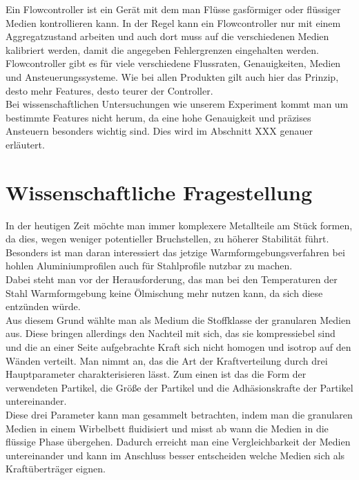 Ein Flowcontroller ist ein Gerät mit dem man Flüsse gasförmiger oder flüssiger Medien kontrollieren kann. In der Regel kann ein Flowcontroller nur mit einem Aggregatzustand arbeiten und auch dort muss auf die verschiedenen Medien kalibriert werden, damit die angegeben Fehlergrenzen eingehalten werden. \\
Flowcontroller gibt es für viele verschiedene Flussraten, Genauigkeiten, Medien und Ansteuerungssysteme. Wie bei allen Produkten gilt auch hier das Prinzip, desto mehr Features, desto teurer der Controller. \\
Bei wissenschaftlichen Untersuchungen wie unserem Experiment kommt man um bestimmte Features nicht herum, da eine hohe Genauigkeit und präzises Ansteuern besonders wichtig sind. Dies wird im Abschnitt XXX genauer erläutert.



\section{Wissenschaftliche Fragestellung}

In der heutigen Zeit möchte man immer komplexere Metallteile am Stück formen, da dies, wegen weniger potentieller Bruchstellen, zu höherer Stabilität führt. Besonders ist man daran interessiert das jetzige Warmformgebungsverfahren bei hohlen Aluminiumprofilen auch für Stahlprofile nutzbar zu machen. \\
Dabei steht man vor der Herausforderung, das man bei den Temperaturen der Stahl Warmformgebung keine Ölmischung mehr nutzen kann, da sich diese entzünden würde. \\
Aus diesem Grund wählte man als Medium die Stoffklasse der granularen Medien aus. Diese bringen allerdings den Nachteil mit sich, das sie kompressiebel sind und die an einer Seite aufgebrachte Kraft sich nicht homogen und isotrop auf den Wänden verteilt. 
Man nimmt an, das die Art der Kraftverteilung durch drei Hauptparameter charakterisieren lässt. Zum einen ist das die Form der verwendeten Partikel, die Größe der Partikel und die Adhäsionskrafte der Partikel untereinander. \\
Diese drei Parameter kann man gesammelt betrachten, indem man die granularen Medien in einem Wirbelbett fluidisiert und misst ab wann die Medien in die flüssige Phase übergehen. Dadurch erreicht man eine Vergleichbarkeit der Medien untereinander und kann im Anschluss besser entscheiden welche Medien sich als Kraftüberträger eignen. \\


